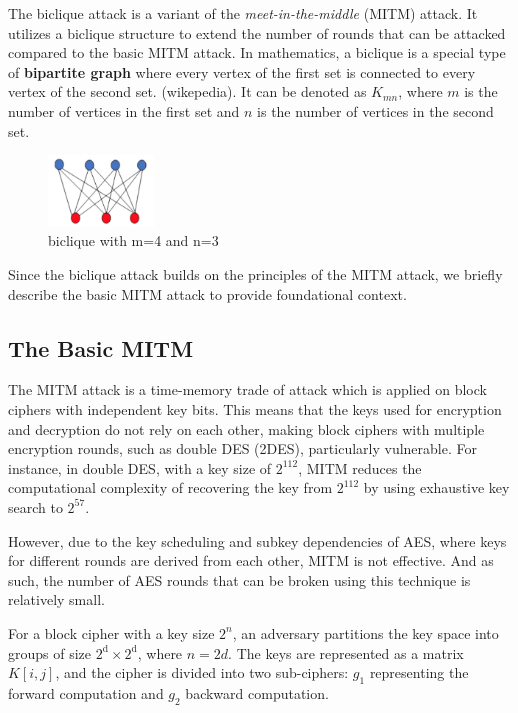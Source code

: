 \documentclass{report}
\begin{document}
 

The biclique attack is a variant of the \emph{meet-in-the-middle} (MITM) attack. 
It utilizes a biclique structure to extend the number of rounds that can be attacked compared to the basic MITM attack. 
In mathematics, a biclique is a special type of \textbf{bipartite graph} where every vertex of the first set is connected to every vertex of the second set. (wikepedia). 
It can be denoted as \(K_{mn}\), where $m$ is the number of vertices in the first set and $n$ is the number of vertices in the second set. 

\begin{figure}[h]
    \centering
    \includegraphics[width=0.25\textwidth]{figures/1.jpg}
    \caption{biclique with m=4 and n=3}
    \label{fig:biclique with m=4 and n=3}
\end{figure}

Since the biclique attack builds on the principles of the MITM attack, we briefly describe the basic MITM attack to provide foundational context. 

\subsection{The Basic MITM}
The MITM attack is a time-memory trade of attack which is applied on block ciphers with independent key bits. This means that the keys used for encryption and decryption do not rely on each other, making block ciphers with multiple encryption rounds, such as double DES (2DES), particularly vulnerable. For instance, in double DES, with a key size of $2^{112}$, MITM reduces the computational complexity of recovering the key from $2^{112}$ by using exhaustive key search to $2^{57}$. 

However, due to the key scheduling and subkey dependencies of AES, where keys for different rounds are derived from each other, MITM is not effective. And as such, the number of AES rounds that can be broken using this technique is relatively small. 

For a block cipher with a key size $2^n$, an adversary partitions the key space into groups of size $2^{\text{d}} \times 2^{\text{d}}$, where \(n = 2d\). The keys are represented as a matrix \(K[i, j]\), and the cipher is divided into two sub-ciphers: $g_1$ representing the forward computation and $g_2$ backward computation. 
\end{document}
